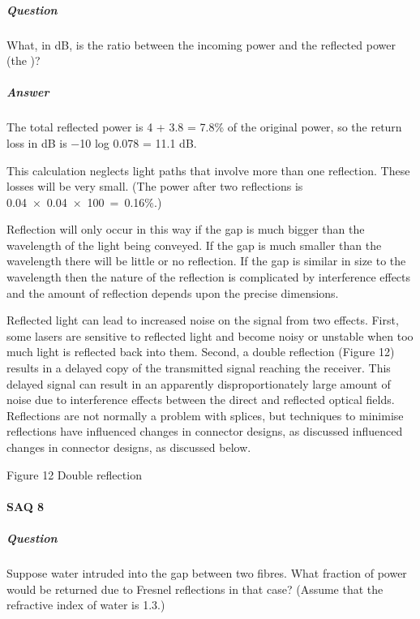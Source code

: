 \documentclass[letterpaper,10pt,english]{sphinxmanual}
\let\sphinxpxdimen\pdfpxdimen\else\newdimen\sphinxpxdimen
\begin{document}
\subparagraph{Question}
\label{\detokenize{content/session_00/Part_00_02:id31}}
What, in dB, is the ratio between the incoming power and the reflected power (the )?


\subparagraph{Answer}
\label{\detokenize{content/session_00/Part_00_02:id32}}
The total reflected power is 4 + 3.8 = 7.8\% of the original power, so the return loss in dB is −10 log 0.078 = 11.1 dB.

This calculation neglects light paths that involve more than one reflection. These losses will be very small. (The power after two reflections is 0.04 × 0.04 × 100 = 0.16\%.)

Reflection will only occur in this way if the gap is much bigger than the wavelength of the light being conveyed. If the gap is much smaller than the wavelength there will be little or no reflection. If the gap is similar in size to the wavelength then the nature of the reflection is complicated by interference effects and the amount of reflection depends upon the precise dimensions.

Reflected light can lead to increased noise on the signal from two effects. First, some lasers are sensitive to reflected light and become noisy or unstable when too much light is reflected back into them. Second, a double reflection (Figure 12) results in a delayed copy of the transmitted signal reaching the receiver. This delayed signal can result in an apparently disproportionately large amount of noise due to interference effects between the direct and reflected optical fields. Reflections
are not normally a problem with splices, but techniques to minimise reflections have influenced changes in connector designs, as discussed influenced changes in connector designs, as discussed below.

\sphinxincludegraphics[width=511\sphinxpxdimen,height=299\sphinxpxdimen]{{t305_012i}.jpg}

Figure 12 Double reflection




\paragraph{SAQ 8}
\label{\detokenize{content/session_00/Part_00_02:SAQ-8}}

\subparagraph{Question}
\label{\detokenize{content/session_00/Part_00_02:id33}}
Suppose water intruded into the gap between two fibres. What fraction of power would be returned due to Fresnel reflections in that case? (Assume that the refractive index of water is 1.3.)
\end{document}
